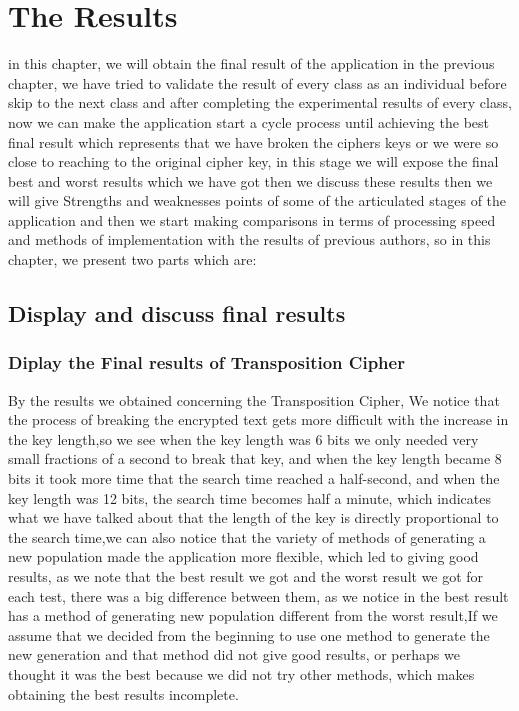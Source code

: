 \chapter{The Results}
in this chapter, we will obtain the final result of the application in the previous chapter, we have tried to validate the result of every class as an individual  before skip to the next class and after completing the experimental results of every class, now we can make the application start a cycle process until achieving the best final result which represents that we have broken the ciphers keys or we were so close to reaching to the original cipher key, in this stage we will expose the final best and worst results which we have got then we discuss these results then we will give Strengths and weaknesses points of some of the articulated stages of the application and then we start making comparisons in terms of processing  speed  and methods of implementation with the results of previous authors,
 so in this chapter, we present two parts which are:
 \section{Display and discuss final results}
 \subsection{Diplay the Final results of Transposition Cipher}
 
 By the results we obtained concerning the Transposition Cipher, We notice that the process of breaking the encrypted text gets more difficult with the increase in the key length,so we see when the key  length was 6 bits we only needed very small fractions of a second to break that key, and when the key  length became 8 bits it took more time that the search time reached a half-second, and when the key length was 12 bits, the search time becomes half a minute, which indicates what we have talked about that the length of the key is directly proportional to the search time,we can also notice that the variety of methods of generating a new population made the application more flexible, which led to giving good results, as we note that the best result we got and the worst result we got for each test, there was a big difference between them, as we notice in the best result has a method of generating new population different from the worst result,If we assume that we decided from the beginning to use one method to generate the new generation and that method did not give good results, or perhaps we thought it was the best because we did not try other methods, which makes obtaining the best results incomplete.
